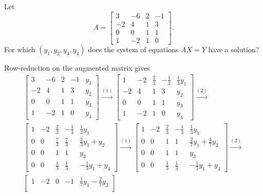  Let
\begin{equation*}
  A =
  \begin{bmatrix}
    3 & -6 & 2 & -1 \\
    -2 & 4 & 1 & 3 \\
    0 & 0 & 1 & 1 \\
    1 & -2 & 1 & 0
  \end{bmatrix}.
\end{equation*}
For which $(y_1,y_2,y_3,y_4)$ does the system of equations $AX=Y$ have
a solution?
\begin{solution}
  Row-reduction on the augmented matrix gives
  \begin{gather*}
    \begin{bmatrix}
      3 & -6 & 2 & -1 & y_1 \\
      -2 & 4 & 1 & 3 & y_2 \\
      0 & 0 & 1 & 1 & y_3 \\
      1 & -2 & 1 & 0 & y_4
    \end{bmatrix}
    \xrightarrow{(1)}
    \begin{bmatrix}
      1 & -2 & \frac23 & -\frac13 & \frac13y_1 \\[3pt]
      -2 & 4 & 1 & 3 & y_2 \\[3pt]
      0 & 0 & 1 & 1 & y_3 \\[3pt]
      1 & -2 & 1 & 0 & y_4
    \end{bmatrix}
    \xrightarrow{(2)} \\
    \begin{bmatrix}
      1 & -2 & \frac23 & -\frac13 & \frac13y_1 \\[3pt]
      0 & 0 & \frac73 & \frac73 & \frac23y_1 + y_2 \\[3pt]
      0 & 0 & 1 & 1 & y_3 \\[3pt]
      0 & 0 & \frac13 & \frac13 & -\frac13y_1 + y_4
    \end{bmatrix}
    \xrightarrow{(1)}
    \begin{bmatrix}
      1 & -2 & \frac23 & -\frac13 & \frac13y_1 \\[3pt]
      0 & 0 & 1 & 1 & \frac27y_1 + \frac37y_2 \\[3pt]
      0 & 0 & 1 & 1 & y_3 \\[3pt]
      0 & 0 & \frac13 & \frac13 & -\frac13y_1 + y_4
    \end{bmatrix}
    \xrightarrow{(2)} \\
    \begin{bmatrix}
      1 & -2 & 0 & -1 & \frac17y_1 - \frac27y_2 \\[3pt]

\end{bmatrix}
\end{gather*}
\end{solution}
